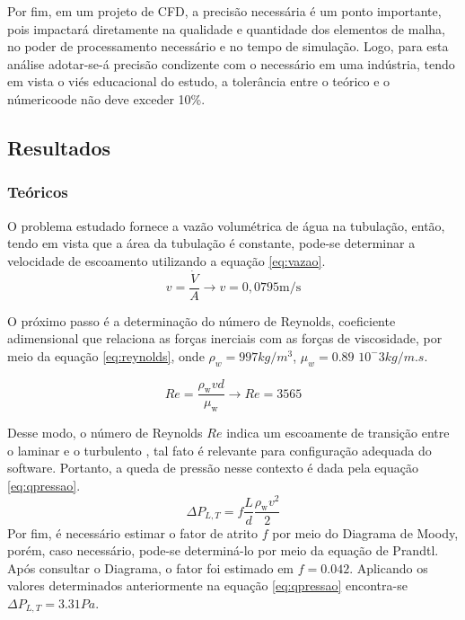 \documentclass[12pt]{article}
\begin{document}
Por fim, em um projeto de CFD, a precisão necessária é um ponto importante, pois impactará diretamente na qualidade e quantidade dos elementos de malha, no poder de processamento necessário e no tempo de simulação. Logo, para esta análise adotar-se-á precisão condizente com o necessário em uma indústria, tendo em vista o viés educacional do estudo, a tolerância entre o teórico e o númericoode não deve exceder 10\%.



\subsection{Resultados}
\label{resultados}
\subsubsection{Teóricos}
O problema estudado fornece a vazão volumétrica de água na tubulação, então, tendo em vista que a área da tubulação é constante, pode-se determinar a velocidade de escoamento utilizando a equação \ref{eq:vazao}.
\begin{equation}
v=\frac{\dot{V}}{A} \rightarrow v=0,0795 \mathrm{m} / \mathrm{s}
\label{eq:vazao}
\end{equation}

O próximo passo é a determinação do número de Reynolds, coeficiente adimensional que relaciona as forças inerciais com as forças de viscosidade, por meio da equação \ref{eq:reynolds}, onde $\rho_{w} = 997 kg/m^3$, $\mu_{w} = 0.89$ $10^-3 kg/m.s$.

\begin{equation}
R e = \frac{\rho_{\text {w}} v d}{\mu_{\text {w}}} \rightarrow R e=3565
\label{eq:reynolds}
\end{equation}

Desse modo, o número de Reynolds $Re$ indica um escoamente de transição entre o laminar e o turbulento \cite{cengel}, tal fato é relevante para configuração adequada do software. Portanto, a queda de pressão nesse contexto é dada pela equação \ref{eq:qpressao}.
\begin{equation}
\Delta P_{L, T} = f \frac{L}{d} \frac{\rho_{\text {w}} v^{2}}{2}
\label{eq:qpressao}
\end{equation}
Por fim, é necessário estimar o fator de atrito $f$ por meio do Diagrama de Moody, porém, caso necessário, pode-se determiná-lo por meio da equação de Prandtl. Após consultar o Diagrama, o fator foi estimado em $f = 0.042$. Aplicando os valores determinados anteriormente na equação \ref{eq:qpressao} encontra-se $\Delta P_{L,T} = 3.31 Pa$.
\end{document}
